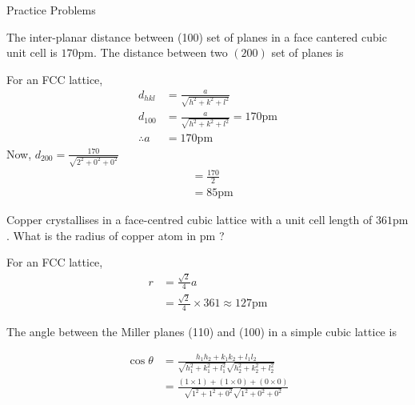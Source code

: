 \newpage
\begin{abox}
	Practice Problems
\end{abox}
\begin{enumerate}
	\begin{minipage}{\textwidth}
		\item The inter-planar distance between (100) set of planes in a face cantered cubic unit cell is $170 \mathrm{pm}$. The distance between two $(200)$ set of planes is
	\end{minipage}
	\begin{answer}
		For an FCC lattice,
		$$
		\begin{aligned}
		d_{h k l} &=\frac{a}{\sqrt{h^{2}+k^{2}+l^{2}}} \\
		d_{100} &=\frac{a}{\sqrt{h^{2}+k^{2}+l^{2}}}=170 \mathrm{pm} \\
		\therefore a &=170 \mathrm{pm}
		\end{aligned}
		$$
		Now, $d_{200}=\frac{170}{\sqrt{2^{2}+0^{2}+0^{2}}}$
		$$
		\begin{aligned}
		&=\frac{170}{2} \\
		&=85 \mathrm{pm}
		\end{aligned}
		$$	
	\end{answer}
	\begin{minipage}{\textwidth}
		\item Copper crystallises in a face-centred cubic lattice with a unit cell length of $361 \mathrm{pm}$. What is the radius of copper atom in $\mathrm{pm}$ ? 
	\end{minipage}
	\begin{answer}
		For an FCC lattice,
		$$
		\begin{aligned}
		r &=\frac{\sqrt{2}}{4} a \\
		&=\frac{\sqrt{2}}{4} \times 361 \approx 127 \mathrm{pm}
		\end{aligned}
		$$	
	\end{answer}
	\begin{minipage}{\textwidth}
		\item  The angle between the Miller planes (110) and (100) in a simple cubic lattice is
	\end{minipage}
	\begin{answer}
		$$\begin{aligned}
		\cos \theta &=\frac{h_{1} h_{2}+k_{1} k_{2}+l_{1} l_{2}}{\sqrt{h_{1}^{2}+k_{1}^{2}+l_{1}^{2}} \sqrt{h_{2}^{2}+k_{2}^{2}+l_{2}^{2}}} \\
		&=\frac{(1 \times 1)+(1 \times 0)+(0 \times 0)}{\sqrt{1^{2}+1^{2}+0^{2}} \sqrt{1^{2}+0^{2}+0^{2}}} \\

\end{aligned}$$
\end{answer}
\end{enumerate}
